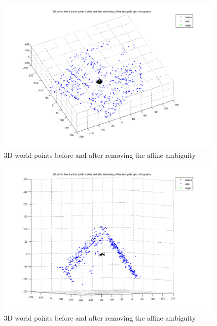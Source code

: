\begin{figure}[!t]
  \begin{center}
  \includegraphics[scale=0.5]{3d1.png}
  \caption{3D world points before and after removing the affine ambiguity} 
  \label{fig:3D1}
  \end{center}
\end{figure}
\begin{figure}[!t]
  \begin{center}
  \includegraphics[scale=0.5]{3d2.png}
  \caption{3D world points before and after removing the affine ambiguity} 
  \label{fig:3D2}
  \end{center}
\end{figure}
